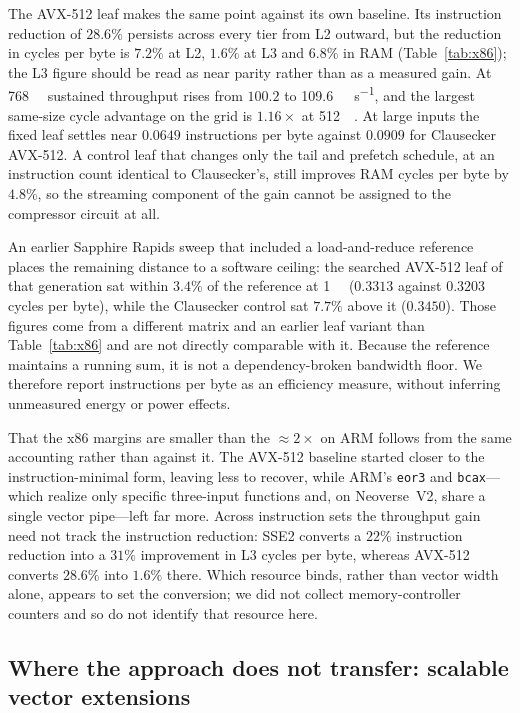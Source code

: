 \documentclass[fleqn,10pt]{wlscirep}
\begin{document}
The AVX-512 leaf makes the same point against its own baseline. Its instruction reduction of $28.6\%$ persists across every tier from L2 outward, but the reduction in cycles per byte is $7.2\%$ at L2, $1.6\%$ at L3 and $6.8\%$ in RAM (Table~\ref{tab:x86}); the L3 figure should be read as near parity rather than as a measured gain. At \SI{768}{\kibi\byte} sustained throughput rises from $100.2$ to \SI{109.6}{\giga\byte\per\second}, and the largest same-size cycle advantage on the grid is $1.16\times$ at \SI{512}{\kibi\byte}. At large inputs the fixed leaf settles near $0.0649$ instructions per byte against $0.0909$ for Clausecker AVX-512. A control leaf that changes only the tail and prefetch schedule, at an instruction count identical to Clausecker's, still improves RAM cycles per byte by $4.8\%$, so the streaming component of the gain cannot be assigned to the compressor circuit at all.

An earlier Sapphire Rapids sweep that included a load-and-reduce reference places the remaining distance to a software ceiling: the searched AVX-512 leaf of that generation sat within $3.4\%$ of the reference at \SI{1}{\gibi\byte} ($0.3313$ against $0.3203$ cycles per byte), while the Clausecker control sat $7.7\%$ above it ($0.3450$). Those figures come from a different matrix and an earlier leaf variant than Table~\ref{tab:x86} and are not directly comparable with it. Because the reference maintains a running sum, it is not a dependency-broken bandwidth floor. We therefore report instructions per byte as an efficiency measure, without inferring unmeasured energy or power effects.

That the x86 margins are smaller than the ${\approx}2\times$ on ARM follows from the same accounting rather than against it. The AVX-512 baseline started closer to the instruction-minimal form, leaving less to recover, while ARM's \texttt{eor3} and \texttt{bcax}---which realize only specific three-input functions and, on Neoverse~V2, share a single vector pipe---left far more. Across instruction sets the throughput gain need not track the instruction reduction: SSE2 converts a $22\%$ instruction reduction into a $31\%$ improvement in L3 cycles per byte, whereas AVX-512 converts $28.6\%$ into $1.6\%$ there. Which resource binds, rather than vector width alone, appears to set the conversion; we did not collect memory-controller counters and so do not identify that resource here.


\subsection*{Where the approach does not transfer: scalable vector extensions}
\end{document}
